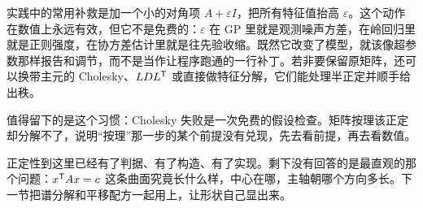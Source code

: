 实践中的常用补救是加一个小的对角项 \(A+\varepsilon I\)，把所有特征值抬高 \(\varepsilon\)。这个动作在数值上永远有效，但它不是免费的：\(\varepsilon\) 在 GP 里就是观测噪声方差，在岭回归里就是正则强度，在协方差估计里就是往先验收缩。既然它改变了模型，就该像超参数那样报告和调节，而不是当作让程序跑通的一行补丁。若非要保留原矩阵，还可以换带主元的 Cholesky、\(LDL^{\mathsf{T}}\) 或直接做特征分解，它们能处理半正定并顺手给出秩。

值得留下的是这个习惯：Cholesky 失败是一次免费的假设检查。矩阵按理该正定却分解不了，说明``按理''那一步的某个前提没有兑现，先去看前提，再去看数值。

正定性到这里已经有了判据、有了构造、有了实现。剩下没有回答的是最直观的那个问题：\(x^{\mathsf{T}}Ax=c\) 这条曲面究竟长什么样，中心在哪，主轴朝哪个方向多长。下一节把谱分解和平移配方一起用上，让形状自己显出来。
